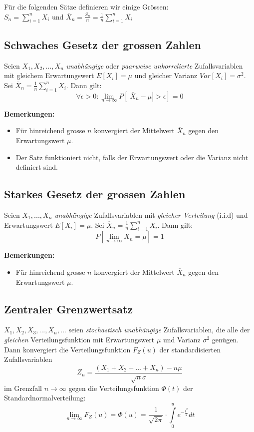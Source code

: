 \documentclass[10pt,a4paper,twocolumn]{article}
\begin{document}
Für die folgenden Sätze definieren wir einige Grössen:\\
$S_n=\sum\limits_{i=1}^{n}X_i$ und $\overline{X}_n=\frac{S_n}{n}=\frac{1}{n}\sum\limits_{i=1}^{n}X_i$

\subsection{Schwaches Gesetz der grossen Zahlen}
Seien $X_1,X_2,...,X_n$ \emph{unabhängige} oder \emph{paarweise unkorrelierte} Zufallsvariablen mit gleichem Erwartungswert $E[X_i]=\mu$ und gleicher Varianz $Var[X_i]=\sigma^2$. Sei $\overline{X}_n=\frac{1}{n}\sum\nolimits_{i=1}^{n}X_i$. Dann gilt:
\[
\forall\epsilon>0:\lim_{n\to\infty}P\left[|\overline{X}_n-\mu|>\epsilon\right]=0
\]

\textbf{Bemerkungen:}
\begin{itemize}
\item Für hinreichend grosse $n$ konvergiert der Mittelwert $\overline{X}_n$ gegen den Erwartungswert $\mu$.
\item Der Satz funktioniert nicht, falls der Erwartungswert oder die Varianz nicht definiert sind.
\end{itemize}

\subsection{Starkes Gesetz der grossen Zahlen}
Seien $X_1,...,X_n$ \emph{unabhängige} Zufallsvariablen mit \emph{gleicher Verteilung} (i.i.d) und Erwartungswert $E[X_i]=\mu$. Sei $\overline{X}_n=\frac{1}{n}\sum\nolimits_{i=1}^{n}X_i$. Dann gilt:
\[
P\left[\lim_{n\to\infty}\overline{X}_n=\mu\right]=1
\]

\textbf{Bemerkungen:}
\begin{itemize}
\item Für hinreichend grosse $n$ konvergiert der Mittelwert $\overline{X}_n$ gegen den Erwartungswert $\mu$.
\end{itemize}

\subsection{Zentraler Grenzwertsatz}
$X_1,X_2,X_3,...,X_n,...$ seien \emph{stochastisch unabhängige} Zufallsvariablen, die alle der \emph{gleichen} Verteilungsfunktion mit Erwartungswert $\mu$ und Varianz $\sigma^2$ genügen. Dann konvergiert die Verteilungsfunktion $F_Z(u)$ der standardisierten Zufallsvariablen
\[
Z_n=\frac{(X_1+X_2+...+X_n)-n\mu}{\sqrt{n}\sigma}
\]
im Grenzfall $n\rightarrow\infty$ gegen die Verteilungsfunktion $\Phi(t)$ der Standardnormalverteilung:
\[
\lim_{n\to\infty}F_Z(u)=\Phi(u)=\frac{1}{\sqrt{2\pi}}\cdot\int\limits_{0}^{u}e^{-\frac{t^2}{2}}dt
\]
\end{document}
